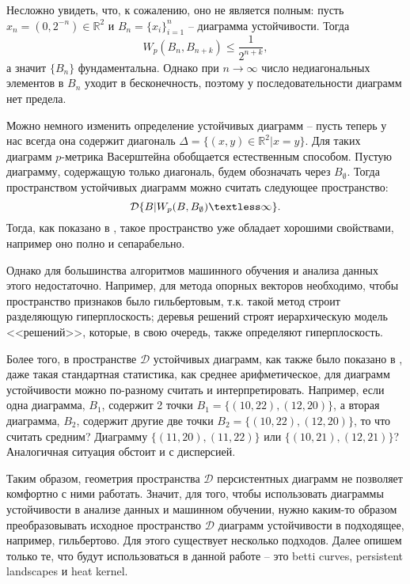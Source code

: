 Несложно увидеть, что, к сожалению, оно не является полным: пусть $x_n = (0, 2^{-n}) \in \mathbb{R}^2$ и $B_n = \{x_i\}_{i=1}^n$ -- диаграмма устойчивости. Тогда
\[
	W_p(B_n, B_{n+k}) \leq \frac{1}{2^{n+k}},
\]
а значит $\{B_n\}$ фундаментальна. Однако при $n \to \infty$ число недиагональных элементов в $B_n$ уходит в бесконечность, поэтому у последовательности диаграмм нет предела. 

Можно немного изменить определение устойчивых диаграмм -- пусть теперь у нас всегда она содержит диагональ $\Delta = \{(x,y) \in \mathbb{R}^2 | x=y\}$. Для таких диаграмм $p$-метрика Васерштейна обобщается естественным способом. Пустую диаграмму, содержащую только диагональ, будем обозначать через $B_\emptyset$. Тогда пространством устойчивых диаграмм можно считать следующее пространство:
\[
	\mathcal{D} \{ B | W_p(B, B_\emptyset) \textless \infty \}.
\]
Тогда, как показано в \cite{prop_measures}, такое пространство уже обладает хорошими свойствами, например оно полно и сепарабельно.

Однако для большинства алгоритмов машинного обучения и анализа данных этого недостаточно. Например, для метода опорных векторов необходимо, чтобы пространство признаков было гильбертовым, т.к. такой метод строит разделяющую гиперплоскость; деревья решений строят иерархическую модель <<решений>>, которые, в свою очередь, также определяют гиперплоскость. 

Более того, в пространстве $\mathcal{D}$ устойчивых диаграмм, как также было показано в \cite{prop_measures}, даже такая стандартная статистика, как среднее арифметическое, для диаграмм устойчивости можно по-разному считать и интерпретировать. Например, если одна диаграмма, $B_1$, содержит 2 точки $B_1 = \{ (10, 22), (12, 20) \}$, а вторая диаграмма, $B_2$, содержит другие две точки $B_2 = \{ (10, 22), (12, 20) \}$, то что считать средним? Диаграмму $ \{ (11, 20), (11, 22) \}$ или $\{ (10,21), (12,21) \}$? Аналогичная ситуация обстоит и с дисперсией. 

Таким образом, геометрия пространства $\mathcal{D}$ персистентных диаграмм не позволяет комфортно с ними работать. Значит, для того, чтобы использовать диаграммы устойчивости в анализе данных и машинном обучении, нужно каким-то образом преобразовывать исходное пространство $\mathcal{D}$ диаграмм устойчивости в подходящее, например, гильбертово. Для этого существует несколько подходов. Далее опишем только те, что будут использоваться в данной работе -- это betti curves, persistent landscapes и heat kernel.

